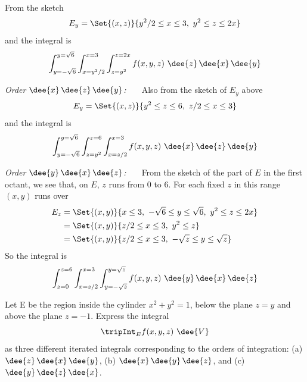 \begin{solution}
From the sketch
\begin{equation*}
E_y = \Set{(x,z)}{y^2/2\le x\le 3,\ y^2\le z\le 2x}
\end{equation*}
and the integral is
\begin{equation*}
\int_{y=-\sqrt{6}}^{y=\sqrt{6}}\int_{x=y^2/2}^{x=3}\int_{z=y^2}^{z=2x}
                f(x,y,z)\ \dee{z}\,\dee{x}\,\dee{y} 
\end{equation*} 


\emph{Order $\dee{x}\,\dee{z}\,\dee{y}$:\ \ \ }
Also from the sketch of $E_y$ above
\begin{equation*}
E_y = \Set{(x,z)}{y^2\le z\le 6,\ z/2\le x\le 3}
\end{equation*}
and the integral is
\begin{equation*}
\int_{y=-\sqrt{6}}^{y=\sqrt{6}}\int_{z=y^2}^{z=6}\int_{x=z/2}^{x=3}
                f(x,y,z)\ \dee{x}\,\dee{z}\,\dee{y} 
\end{equation*} 


\emph{Order $\dee{y}\,\dee{x}\,\dee{z}$:\ \ \ }
From the sketch of the part of $E$ in the first octant, we see that,
on $E$, $z$ runs from $0$ to $6$. For each fixed $z$
in this range $(x,y)$ runs over 
\begin{align*}
E_z&=\Set{(x,y)}{x\le 3,\ -\sqrt{6}\le y\le \sqrt{6},\ y^2\le z\le 2x} \\
&=\Set{(x,y)}{z/2\le x\le 3,\ y^2\le z} \\
&=\Set{(x,y)}{z/2\le x\le 3,\ -\sqrt{z}\le y\le \sqrt{z} } 
\end{align*}
So the integral is
\begin{equation*}
\int_{z=0}^{z=6}\int_{x=z/2}^{x=3}\int_{y=-\sqrt{z}}^{y=\sqrt{z}}
                f(x,y,z)\ \dee{y}\,\dee{x}\,\dee{z} 
\end{equation*}
\end{solution}

\begin{question}[M200 2015D] %
Let E be the region inside the cylinder $x^2 + y^2 = 1$, 
below the plane $z = y$ and above the plane $z = -1$. Express 
the integral
\begin{equation*}
\tripInt_E f(x,y,z)\ \dee{V}
\end{equation*}
as three different iterated integrals corresponding to the orders 
of integration: (a) $\dee{z}\, \dee{x}\, \dee{y}$,
(b) $\dee{x}\, \dee{y}\, \dee{z}$, and (c) $\dee{y}\, \dee{z}\, \dee{x}$.
\end{question}

